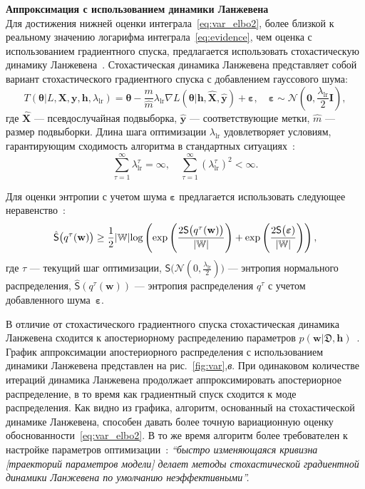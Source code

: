 \textbf{Аппроксимация с использованием динамики Ланжевена}\\
Для достижения нижней оценки интеграла~\eqref{eq:var_elbo2}, более близкой к реальному значению логарифма интеграла~\eqref{eq:evidence}, чем оценка с использованием градиентного спуска, предлагается использовать стохастическую динамику Ланжевена~\cite{langevin}. Стохастическая динамика Ланжевена представляет собой вариант стохастического градиентного спуска с добавлением гауссового шума:
\begin{equation}
\label{eq:langevin}
	T( \boldsymbol{\theta}| L,\mathbf{X},  \mathbf{y},  \mathbf{h}, {\lambda_{\text{lr}}}) = \boldsymbol{\theta} -\frac{m}{\hat{m}}  \lambda_{\text{lr}} \nabla L(\boldsymbol{\theta}| \mathbf{h}, \hat{\mathbf{X}}, \hat{\mathbf{y}})  + \boldsymbol{\varepsilon}, \quad  \boldsymbol{\varepsilon} \sim \mathcal{N}(\mathbf{0}, {\frac{\lambda_{\text{lr}}}{2}}\mathbf{I}),
\end{equation}
где $\hat{\mathbf{X}}$ --- псевдослучайная подвыборка, $\hat{\mathbf{y}}$ --- соответствующие метки, $\hat{m}$ --- размер подвыборки. Длина шага оптимизации $\lambda_{\text{lr}}$ удовлетворяет  {условиям, гарантирующим сходимость алгоритма в стандартных ситуациях~\cite{langevin}}:
\[
	\sum_{\tau=1}^\infty \lambda_{\text{lr}}^\tau = \infty, \quad \sum_{\tau=1}^\infty (\lambda_{\text{lr}}^\tau)^2 < \infty.
\]

Для оценки энтропии с учетом шума $\boldsymbol{\varepsilon}$ предлагается использовать следующее неравенство~\cite{entropy,var_grad}:
\[
\hat{\mathsf{S}}\bigl(q^\tau(\mathbf{w})\bigr)   \geq \frac{1}{2}|\mathbb{W}|\textnormal{log}\left(\textnormal{exp}\left(\frac{2\mathsf{S}\bigl(q^\tau(\mathbf{w})\bigr)}{|\mathbb{W}|}\right) + \textnormal{exp}\left(\frac{2\mathsf{S}\bigl( \boldsymbol{\varepsilon})}{|\mathbb{W}|}\right)\right),
\]
{где  $\tau$ --- текущий шаг оптимизации,} $\mathsf{S}\bigl( \mathcal{N}({0}, {\frac{\lambda_{\text{lr}}}{2}})\bigr)$ --- энтропия нормального распределения, $\hat{\mathsf{S}}(q^\tau(\mathbf{w}))$ --- энтропия распределения $q^\tau$ с учетом добавленного шума~$\boldsymbol{\varepsilon}$.


В отличие от стохастического градиентного спуска стохастическая динамика Ланжевена сходится к апостериорному распределению параметров $p(\mathbf{w}|\mathfrak{D},\mathbf{h})$~\cite{langevin, langevin_sato}.  График аппроксимации апостериорного распределения с использованием динамики Ланжевена представлен на рис.~\ref{fig:var},\textit{в}. При одинаковом количестве итераций динамика Ланжевена продолжает аппроксимировать апостериорное распределение, в то время как градиентный спуск сходится к моде распределения. {Как видно из графика, алгоритм, основанный на стохастической динамике Ланжевена, способен давать более точную вариационную оценку обоснованности~\eqref{eq:var_elbo2}. В то же время алгоритм более требователен к настройке параметров оптимизации~\cite{sgld}: \textit{``быстро изменяющаяся кривизна [траекторий параметров модели] делает методы стохастической градиентной динамики Ланжевена по умолчанию неэффективными''.}}





